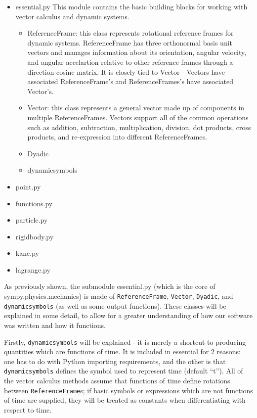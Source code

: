 \documentclass[twocolumn,10pt]{asme2e}
\begin{document}
\begin{itemize}
    \item essential.py
        This module contains the basic building blocks for working
        with vector calculus and dynamic systems.
        \begin{itemize}
            \item ReferenceFrame: this class represents rotational reference
            frames for dynamic systems. ReferenceFrame has three orthonormal
            basis unit vectors and manages information about its orientation,
            angular velocity, and angular accelartion relative to other
            reference frames through a direction cosine matrix. It is closely
            tied to Vector - Vectors have associated ReferenceFrame's and
            ReferenceFrames's have associated Vector's.
            \item Vector: this class represents a general vector made up of
            components in multiple ReferenceFrames.  Vectors support all of the
            common operations such as addition, subtraction, multiplication,
            division, dot products, cross products, and re-expression into
            different ReferenceFrames.
            \item Dyadic
            \item dynamicsymbols
        \end{itemize}
    \item point.py
    \item functions.py
    \item particle.py
    \item rigidbody.py
    \item kane.py
    \item lagrange.py
\end{itemize}

As previously shown, the submodule essential.py (which is the core of
sympy.physics.mechanics) is made of \verb|ReferenceFrame|, \verb|Vector|,
\verb|Dyadic|, and \verb|dynamicsymbols| (as well as some output functions).
These classes will be explained in some detail, to allow for a greater
understanding of how our software was written and how it functions.

Firstly, \verb|dynamicsymbols| will be explained - it is merely a shortcut to
producing quantities which are functions of time.
It is included in essential for 2 reasons: one has to do with Python importing
requirements, and the other is that \verb|dynamicsymbols| defines the symbol
used to represent time (default ``t'').
All of the vector calculus methods assume that functions of time define
rotations between \verb|ReferenceFrame|s; if basic symbols or expressions which
are not functions of time are supplied, they will be treated as constants when
differentiating with respect to time.
\end{document}
